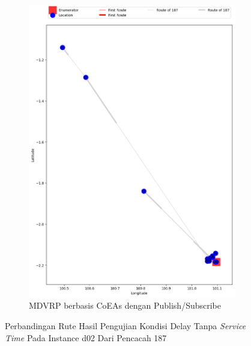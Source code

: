\begin{figure}[H]\ContinuedFloat
	\centering
	\begin{subfigure}[t]{\textwidth}
		\centering
		\includegraphics[width=\textwidth]{Resources/Images/delayed_2/real_m15_n100_delayed_2_187_pubsub_coes}
		\caption{MDVRP berbasis CoEAs dengan Publish/Subscribe}
		\label{fig:real_m15_n100_delayed_2_187_pubsub_coes}
	\end{subfigure}
	\caption{Perbandingan Rute Hasil Pengujian Kondisi Delay Tanpa \textit{Service Time} Pada Instance d02 Dari Pencacah 187}
	\label{fig:real_m15_n100_delayed_2_187_contd}
\end{figure}


